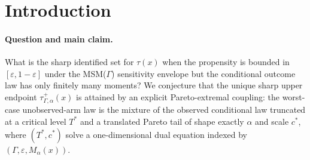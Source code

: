 \documentclass[11pt]{article}
\theoremstyle{definition}
\theoremstyle{plain}
\theoremstyle{remark}
\begin{document}
\begin{abstract}
We propose a representation theorem for the sharp marginal sensitivity model (MSM) bounds on the conditional average treatment effect (CATE) when potential outcomes are heavy-tailed: the worst-case counterfactual conditional law that attains the upper endpoint \(\tau^+_{\Gamma,\alpha}(x)\) is identified with a Pareto-extremal coupling whose tail shape equals the moment index \(\alpha\) and whose scale is the unique root of a one-dimensional dual equation. The headline conjecture is that this Pareto coupling exists, is the unique sharp optimizer, makes the identified-set width \(W_{\Gamma,\alpha}(x)\) strictly monotone in \(\alpha\), and recovers the \cite{KallusMaoZhou2019CATEIntervals} bounded-outcome MSM bound as \(\alpha\to\infty\), so the support-only bound is the degenerate limit of a one-parameter family of strictly tighter heavy-tail bounds. A companion theorem shows the inner program is a strongly convex linear program with a closed-form dual certificate, and a phase-transition corollary records that the bound becomes Manski-vacuous as \(\alpha\downarrow 1\). Resolving the kernel turns "MSM under heavy tails" from a regime where current bounds either fail to exist or collapse to support-only Manski into a regime with sharp, computable, \(\alpha\)-indexed endpoints, supplying \cite{YadlowskyNamkoongBasuDuchiTian2022Bounds} with the missing alpha-tail dual it needed to extend orthogonal sensitivity inference past bounded outcomes.
\end{abstract}

\section{Introduction}

\paragraph{Question and main claim.} What is the sharp identified set for $\tau(x)$ when the propensity is bounded in $[\varepsilon, 1-\varepsilon]$ under the MSM($\Gamma$) sensitivity envelope but the conditional outcome law has only finitely many moments? We conjecture that the unique sharp upper endpoint $\tau^+_{\Gamma,\alpha}(x)$ is attained by an explicit Pareto-extremal coupling: the worst-case unobserved-arm law is the mixture of the observed conditional law truncated at a critical level $T^\ast$ and a translated Pareto tail of shape exactly $\alpha$ and scale $c^\ast$, where $(T^\ast, c^\ast)$ solve a one-dimensional dual equation indexed by $(\Gamma, \varepsilon, M_\alpha(x))$.
\end{document}
